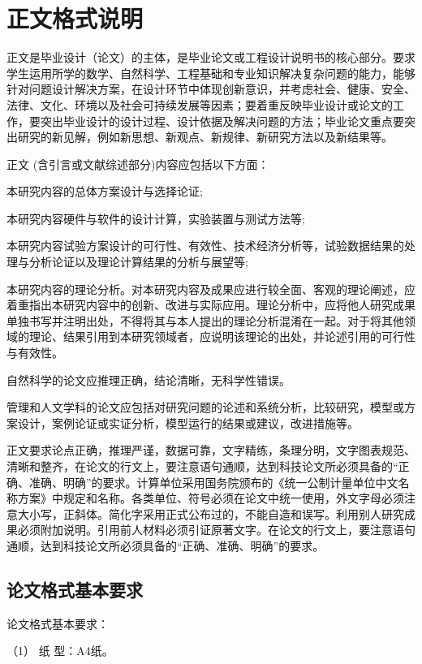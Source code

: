 
\chapter{正文格式说明}
\label{chap01}
正文是毕业设计（论文）的主体，是毕业论文或工程设计说明书的核心部分。要求学生运用所学的数学、自然科学、工程基础和专业知识解决复杂问题的能力，能够针对问题设计解决方案，在设计环节中体现创新意识，并考虑社会、健康、安全、法律、文化、环境以及社会可持续发展等因素；要着重反映毕业设计或论文的工作，要突出毕业设计的设计过程、设计依据及解决问题的方法；毕业论文重点要突出研究的新见解，例如新思想、新观点、新规律、新研究方法以及新结果等。

正文 (含引言或文献综述部分)内容应包括以下方面：


本研究内容的总体方案设计与选择论证;

本研究内容硬件与软件的设计计算，实验装置与测试方法等;

本研究内容试验方案设计的可行性、有效性、技术经济分析等，试验数据结果的处理与分析论证以及理论计算结果的分析与展望等;

本研究内容的理论分析。对本研究内容及成果应进行较全面、客观的理论阐述，应着重指出本研究内容中的创新、改进与实际应用。理论分析中，应将他人研究成果单独书写并注明出处，不得将其与本人提出的理论分析混淆在一起。对于将其他领域的理论、结果引用到本研究领域者，应说明该理论的出处，并论述引用的可行性与有效性。

自然科学的论文应推理正确，结论清晰，无科学性错误。

管理和人文学科的论文应包括对研究问题的论述和系统分析，比较研究，模型或方案设计，案例论证或实证分析，模型运行的结果或建议，改进措施等。

正文要求论点正确，推理严谨，数据可靠，文字精练，条理分明，文字图表规范、清晰和整齐，在论文的行文上，要注意语句通顺，达到科技论文所必须具备的“正确、准确、明确”的要求。计算单位采用国务院颁布的《统一公制计量单位中文名称方案》中规定和名称。各类单位、符号必须在论文中统一使用，外文字母必须注意大小写，正斜体。简化字采用正式公布过的，不能自造和误写。利用别人研究成果必须附加说明。引用前人材料必须引证原著文字。在论文的行文上，要注意语句通顺，达到科技论文所必须具备的“正确、准确、明确”的要求。

\section{论文格式基本要求}
论文格式基本要求：

（1） 纸  型：A4纸。

